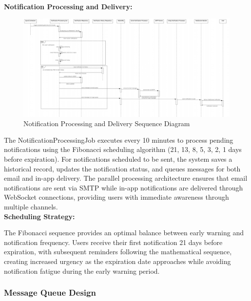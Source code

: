 \newpage
\noindent
\textbf{Notification Processing and Delivery:}

\begin{figure}[H]
    \centering
    \includegraphics[width=1\textwidth]{images/notification_processing_sequence.png}
    \caption{Notification Processing and Delivery Sequence Diagram}
    \label{fig:notification_processing_sequence}
\end{figure}

\noindent
The NotificationProcessingJob executes every 10 minutes to process pending notifications using the Fibonacci scheduling algorithm (21, 13, 8, 5, 3, 2, 1 days before expiration). For notifications scheduled to be sent, the system saves a historical record, updates the notification status, and queues messages for both email and in-app delivery. The parallel processing architecture ensures that email notifications are sent via SMTP while in-app notifications are delivered through WebSocket connections, providing users with immediate awareness through multiple channels.\\

\noindent
\textbf{Scheduling Strategy:}

\noindent
The Fibonacci sequence provides an optimal balance between early warning and notification frequency. Users receive their first notification 21 days before expiration, with subsequent reminders following the mathematical sequence, creating increased urgency as the expiration date approaches while avoiding notification fatigue during the early warning period.

\newpage
\subsubsection{Message Queue Design}

